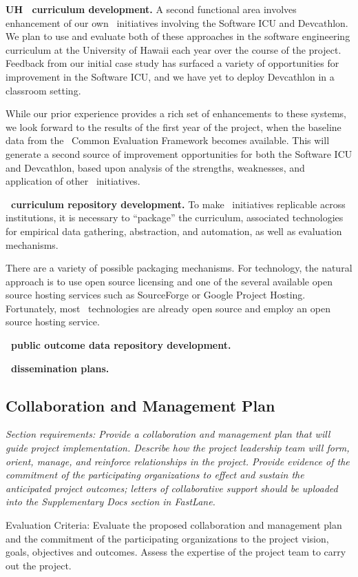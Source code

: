 {\bf UH \eCT\ curriculum development.}  A second functional area involves
enhancement of our own \eCT\ initiatives involving the Software ICU and
Devcathlon. We plan to use and evaluate both of these approaches in the
software engineering curriculum at the University of Hawaii each year over
the course of the project.  Feedback from our initial case study
\cite{csdl2-09-02,csdl2-09-03} has surfaced a variety of opportunities for
improvement in the Software ICU, and we have yet to deploy Devcathlon in a
classroom setting.

While our prior experience provides a rich set of enhancements to these
systems, we look forward to the results of the first year of the project,
when the baseline data from the \eCT\ Common Evaluation Framework becomes
available.  This will generate a second source of improvement opportunities
for both the Software ICU and Devcathlon, based upon analysis of the
strengths, weaknesses, and application of other \eCT\ initiatives. 

{\bf \eCT\ curriculum repository development.}  To make \eCT\ initiatives
replicable across institutions, it is necessary to ``package'' the
curriculum, associated technologies for empirical data gathering,
abstraction, and automation, as well as evaluation mechanisms.  

There are a variety of possible packaging mechanisms.  For technology, the 
natural approach is to use open source licensing and one of the several
available open source hosting services such as SourceForge or Google Project
Hosting.  Fortunately, most \eCT\ technologies are already open source and
employ an open source hosting service.



{\bf \eCT\ public outcome data repository development.}



{\bf \eCT\ dissemination plans.}


\subsection{Collaboration and Management Plan}

{\em Section requirements: Provide a collaboration and management plan that
will guide project implementation.  Describe how the project leadership
team will form, orient, manage, and reinforce relationships in the project.
Provide evidence of the commitment of the participating organizations to
effect and sustain the anticipated project outcomes; letters of
collaborative support should be uploaded into the Supplementary Docs
section in FastLane.

Evaluation Criteria: Evaluate the proposed collaboration and management
plan and the commitment of the participating organizations to the project
vision, goals, objectives and outcomes.  Assess the expertise of the
project team to carry out the project.
}
\bigskip

